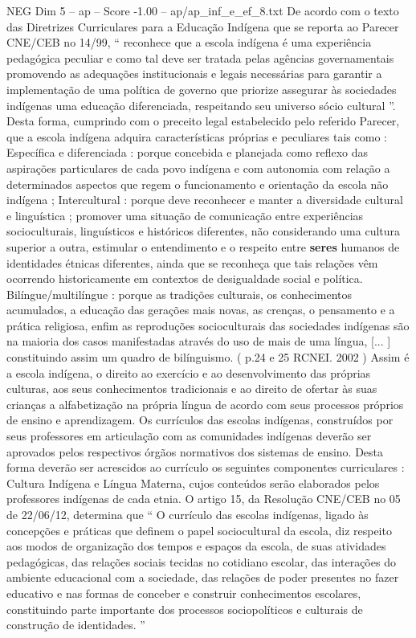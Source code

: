 \begin{textsample}{NEG Dim 5 – ap – Score -1.00 – ap/ap\_inf\_e\_ef\_8.txt}
De acordo com o texto das Diretrizes Curriculares para a Educação Indígena que se reporta ao Parecer CNE/CEB no 14/99, “ reconhece que a escola indígena é uma experiência pedagógica peculiar e como tal deve ser tratada pelas agências governamentais promovendo as adequações institucionais e legais necessárias para garantir a implementação de uma política de governo que priorize assegurar às sociedades indígenas uma educação diferenciada, respeitando seu universo sócio cultural ”.
Desta forma, cumprindo com o preceito legal estabelecido pelo referido Parecer, que a escola indígena adquira características próprias e peculiares tais como : Específica e diferenciada : porque concebida e planejada como reflexo das aspirações particulares de cada povo indígena e com autonomia com relação a determinados aspectos que regem o funcionamento e orientação da escola não indígena ; Intercultural : porque deve reconhecer e manter a diversidade cultural e linguística ; promover uma situação de comunicação entre experiências socioculturais, linguísticos e históricos diferentes, não considerando uma cultura superior a outra, estimular o entendimento e o respeito entre \textbf{seres} humanos de identidades étnicas diferentes, ainda que se reconheça que tais relações vêm ocorrendo historicamente em contextos de desigualdade social e política.
Bilíngue/multilíngue : porque as tradições culturais, os conhecimentos acumulados, a educação das gerações mais novas, as crenças, o pensamento e a prática religiosa, enfim as reproduções socioculturais das sociedades indígenas são na maioria dos casos manifestadas através do uso de mais de uma língua, [... ] constituindo assim um quadro de bilínguismo. ( p.24 e 25 RCNEI. 2002 ) Assim é a escola indígena, o direito ao exercício e ao desenvolvimento das próprias culturas, aos seus conhecimentos tradicionais e ao direito de ofertar às suas crianças a alfabetização na própria língua de acordo com seus processos próprios de ensino e aprendizagem.
Os currículos das escolas indígenas, construídos por seus professores em articulação com as comunidades indígenas deverão ser aprovados pelos respectivos órgãos normativos dos sistemas de ensino.
Desta forma deverão ser acrescidos ao currículo os seguintes componentes curriculares : Cultura Indígena e Língua Materna, cujos conteúdos serão elaborados pelos professores indígenas de cada etnia.
O artigo 15, da Resolução CNE/CEB no 05 de 22/06/12, determina que “ O currículo das escolas indígenas, ligado às concepções e práticas que definem o papel sociocultural da escola, diz respeito aos modos de organização dos tempos e espaços da escola, de suas atividades pedagógicas, das relações sociais tecidas no cotidiano escolar, das interações do ambiente educacional com a sociedade, das relações de poder presentes no fazer educativo e nas formas de conceber e construir conhecimentos escolares, constituindo parte importante dos processos sociopolíticos e culturais de construção de identidades. ”

\end{textsample}
